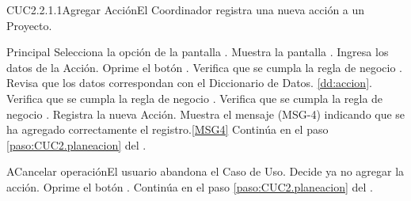 	\begin{UseCase}{CUC2.2.1.1}{Agregar Acción}{El Coordinador registra una nueva acción a un Proyecto.}
	\end{UseCase}

	\begin{UCtrayectoria}{Principal}
			\UCpaso[\UCactor] Selecciona la opción  de la pantalla . %
			\UCpaso Muestra la pantalla .
			\UCpaso [\UCactor] Ingresa los datos de la Acción. \label{paso:CUC13.1ingresaDatosAccion}
			\UCpaso [\UCactor] Oprime el botón .
			\UCpaso Verifica que se cumpla la regla de negocio .  
			\UCpaso Revisa que los datos correspondan con el Diccionario de Datos. \ref{dd:accion}. 
			\UCpaso Verifica que se cumpla la regla de negocio .  
			\UCpaso Verifica que se cumpla la regla de negocio .  
			\UCpaso Registra la nueva Acción.
			\UCpaso Muestra el mensaje (MSG-4) indicando que se ha agregado correctamente el registro.\ref{MSG4}
			\UCpaso Continúa en el paso \ref{paso:CUC2.planeacion} del .
	\end{UCtrayectoria}

	\begin{UCtrayectoriaA}{A}{Cancelar operación}{El usuario abandona el Caso de Uso.}
			\UCpaso[\UCactor] Decide ya no agregar la acción.
			\UCpaso[\UCactor] Oprime el botón .
			\UCpaso Continúa en el paso \ref{paso:CUC2.planeacion} del .
	\end{UCtrayectoriaA}
		

